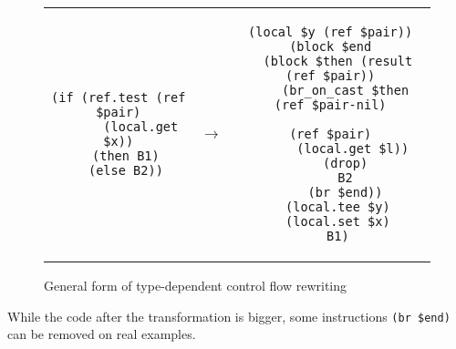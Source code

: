 \documentclass[a4paper,11pt]{article}
\begin{document}
\begin{figure}[h]
  \centering
  \begin{tabular}{c c c}
    \begin{minipage}{\widthof{\texttt{(if (ref.test (ref \$pair)}}}
\begin{verbatim}
(if (ref.test (ref $pair)
      (local.get $x))
  (then B1)
  (else B2))
\end{verbatim}
\end{minipage}
    &
    $\rightarrow$
    &
\begin{minipage}{\widthof{\texttt{....(br\_on\_cast \$then (ref \$pair-nil)}}}
\begin{verbatim}
(local $y (ref $pair))
(block $end
  (block $then (result (ref $pair))
    (br_on_cast $then (ref $pair-nil)
                      (ref $pair)
      (local.get $l))
    (drop)
    B2
    (br $end))
  (local.tee $y)
  (local.set $x)
  B1)
\end{verbatim}
\end{minipage}
  \end{tabular}
  \caption{General form of type-dependent control flow rewriting}\label{br}
\end{figure}

While the code after the transformation is bigger, some instructions \texttt{(br
  \$end)} can be removed on real examples.

\end{document}

